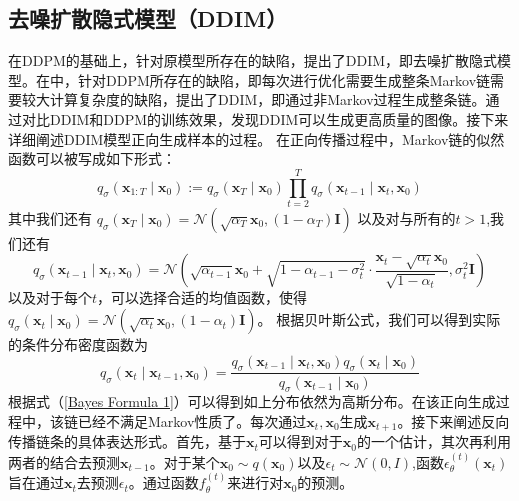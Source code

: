 \subsection{去噪扩散隐式模型（DDIM）}
在DDPM的基础上，针对原模型所存在的缺陷，提出了DDIM，即去噪扩散隐式模型。在\cite{DDIM}中，针对DDPM所存在的缺陷，即每次进行优化需要生成整条Markov链需要较大计算复杂度的缺陷，提出了DDIM，即通过非Markov过程生成整条链。通过对比DDIM和DDPM的训练效果，发现DDIM可以生成更高质量的图像。接下来详细阐述DDIM模型正向生成样本的过程。
在正向传播过程中，Markov链的似然函数可以被写成如下形式：
\begin{equation}
    q_\sigma\left(\boldsymbol{x}_{1: T} \mid \boldsymbol{x}_0\right):=q_\sigma\left(\boldsymbol{x}_T \mid \boldsymbol{x}_0\right) \prod_{t=2}^T q_\sigma\left(\boldsymbol{x}_{t-1} \mid \boldsymbol{x}_t, \boldsymbol{x}_0\right)
\end{equation}
其中我们还有 $q_\sigma\left(\boldsymbol{x}_T \mid \boldsymbol{x}_0\right)=\mathcal{N}\left(\sqrt{\alpha_T} \boldsymbol{x}_0,\left(1-\alpha_T\right) \boldsymbol{I}\right)$ 以及对与所有的$t>1$,我们还有
$$
q_\sigma\left(\boldsymbol{x}_{t-1} \mid \boldsymbol{x}_t, \boldsymbol{x}_0\right)=\mathcal{N}\left(\sqrt{\alpha_{t-1}} \boldsymbol{x}_0+\sqrt{1-\alpha_{t-1}-\sigma_t^2} \cdot \frac{\boldsymbol{x}_t-\sqrt{\alpha_t} \boldsymbol{x}_0}{\sqrt{1-\alpha_t}}, \sigma_t^2 \boldsymbol{I}\right)
$$
以及对于每个$t$，可以选择合适的均值函数，使得$q_\sigma\left(\boldsymbol{x}_t \mid \boldsymbol{x}_0\right)=\mathcal{N}\left(\sqrt{\alpha_t} \boldsymbol{x}_0,\left(1-\alpha_t\right) \boldsymbol{I}\right)$。
根据贝叶斯公式，我们可以得到实际的条件分布密度函数为
\begin{equation}
   q_\sigma\left(\boldsymbol{x}_t \mid \boldsymbol{x}_{t-1}, \boldsymbol{x}_0\right)=\frac{q_\sigma\left(\boldsymbol{x}_{t-1} \mid \boldsymbol{x}_t, \boldsymbol{x}_0\right) q_\sigma\left(\boldsymbol{x}_t \mid \boldsymbol{x}_0\right)}{q_\sigma\left(\boldsymbol{x}_{t-1} \mid \boldsymbol{x}_0\right)}
   \label{Bayes Formula 1}
\end{equation}
根据式（\ref{Bayes Formula 1}）可以得到如上分布依然为高斯分布。在该正向生成过程中，该链已经不满足Markov性质了。每次通过$\boldsymbol{x}_t,\boldsymbol{x}_0$生成$\boldsymbol{x}_{t+1}$。接下来阐述反向传播链条的具体表达形式。首先，基于$\boldsymbol{x}_t$可以得到对于$\boldsymbol{x}_0$的一个估计，其次再利用两者的结合去预测$\boldsymbol{x}_{t-1}$。对于某个$\boldsymbol{x}_0\sim q(\boldsymbol{x}_0)$以及$\epsilon_t \sim \mathcal{N}(0,I)$,函数$\epsilon_{\theta}^{(t)}(\boldsymbol{x}_t)$旨在通过$\boldsymbol{x}_t$去预测$\epsilon_t$。通过函数$f^{(t)}_{\theta}$来进行对$\boldsymbol{x}_0$的预测。
